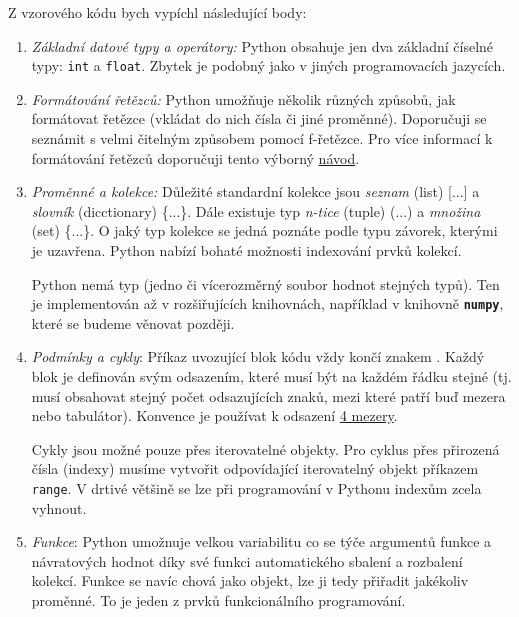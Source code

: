 \documentclass[a4paper,11pt,twoside]{article}
\def\code#1{\textnormal{\texttt{#1}}}
\def\file#1{\textnormal{\textbf{\texttt{#1}}}}
\theoremstyle{red}
\theoremstyle{green}
\begin{document}
    Z vzorového kódu bych vypíchl následující body:
    \begin{enumerate}
        \item 
            \emph{Základní datové typy a operátory:}
            Python obsahuje jen dva základní číselné typy: \code{int} a \code{float}.
            Zbytek je podobný jako v jiných programovacích jazycích.

        \item
            \emph{Formátování řetězců:}
            Python umožňuje několik různých způsobů, jak formátovat řetězce (vkládat do nich čísla či jiné proměnné).
            Doporučuji se seznámit s velmi čitelným způsobem pomocí f-řetězce.            
            Pro více informací k formátování řetězců doporučuji tento výborný \href{https://pyformat.info}{návod}.
    
        \item
            \emph{Proměnné a kolekce:} 
            Důležité standardní kolekce jsou \emph{seznam} (list) [...] a \emph{slovník} (dicctionary) \{...\}.
            Dále existuje typ \emph{n-tice} (tuple) (...) a \emph{množina} (set) \{...\}.
            O jaký typ kolekce se jedná poznáte podle typu závorek, kterými je uzavřena.
            Python nabízí bohaté možnosti indexování prvků kolekcí.

            Python nemá typ  (jedno či vícerozměrný soubor hodnot stejných typů).
            Ten je implementován až v rozšiřujících knihovnách, například v knihovně \file{numpy}, které se budeme věnovat později.
            
        \item
            \emph{Podmínky a cykly}:
            Příkaz uvozující blok kódu vždy končí znakem \uv{:}.
            Každý blok je definován svým odsazením, které musí být na každém řádku stejné
            (tj. musí obsahovat stejný počet odsazujících znaků, mezi které patří buď mezera nebo tabulátor).
            Konvence je používat k odsazení \href{https://www.python.org/dev/peps/pep-0008/#indentation}{4 mezery}.

            Cykly jsou možné pouze přes iterovatelné objekty.
            Pro cyklus přes přirozená čísla (indexy) musíme vytvořit odpovídající iterovatelný objekt příkazem \code{range}.
            V drtivé většině se lze při programování v Pythonu indexům zcela vyhnout.

        \item 
            \emph{Funkce}: Python umožnuje velkou variabilitu co se týče argumentů funkce a návratových hodnot díky své funkci automatického sbalení a rozbalení kolekcí.
            Funkce se navíc chová jako objekt, lze ji tedy přiřadit jakékoliv proměnné.
            To je jeden z prvků funkcionálního programování.


\end{enumerate}
\end{document}
